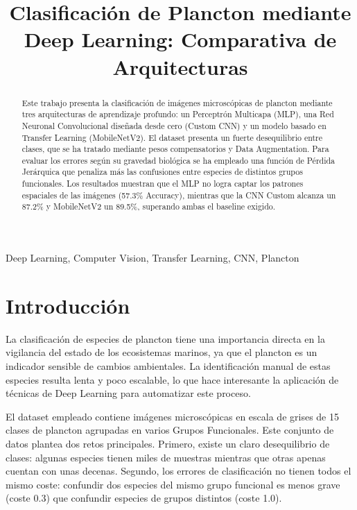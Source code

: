 \documentclass[conference]{IEEEtran}
\begin{document}
\title{Clasificación de Plancton mediante Deep Learning: Comparativa de Arquitecturas\\}

\author{
}

\maketitle

\begin{abstract}
Este trabajo presenta la clasificación de imágenes microscópicas de plancton mediante tres arquitecturas de aprendizaje profundo: un Perceptrón Multicapa (MLP), una Red Neuronal Convolucional diseñada desde cero (Custom CNN) y un modelo basado en Transfer Learning (MobileNetV2). El dataset presenta un fuerte desequilibrio entre clases, que se ha tratado mediante pesos compensatorios y Data Augmentation. Para evaluar los errores según su gravedad biológica se ha empleado una función de Pérdida Jerárquica que penaliza más las confusiones entre especies de distintos grupos funcionales. Los resultados muestran que el MLP no logra captar los patrones espaciales de las imágenes (57.3\% Accuracy), mientras que la CNN Custom alcanza un 87.2\% y MobileNetV2 un 89.5\%, superando ambas el baseline exigido.
\end{abstract}

\begin{IEEEkeywords}
Deep Learning, Computer Vision, Transfer Learning, CNN, Plancton
\end{IEEEkeywords}

\section{Introducción}
La clasificación de especies de plancton tiene una importancia directa en la vigilancia del estado de los ecosistemas marinos, ya que el plancton es un indicador sensible de cambios ambientales. La identificación manual de estas especies resulta lenta y poco escalable, lo que hace interesante la aplicación de técnicas de Deep Learning para automatizar este proceso.

El dataset empleado contiene imágenes microscópicas en escala de grises de 15 clases de plancton agrupadas en varios Grupos Funcionales. Este conjunto de datos plantea dos retos principales. Primero, existe un claro desequilibrio de clases: algunas especies tienen miles de muestras mientras que otras apenas cuentan con unas decenas. Segundo, los errores de clasificación no tienen todos el mismo coste: confundir dos especies del mismo grupo funcional es menos grave (coste 0.3) que confundir especies de grupos distintos (coste 1.0).
\end{document}
